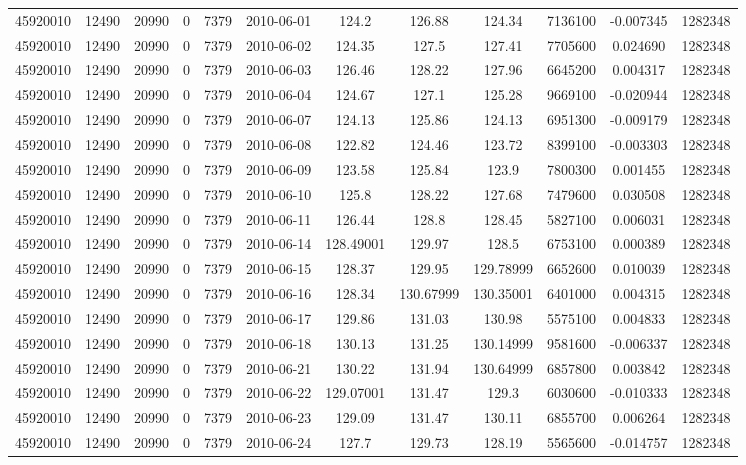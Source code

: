 \documentclass[12 pt]{article}
\begin{document}
\begin{flushleft}
\begin{table}[h]
\begin{tabular}{c c c c c c c c c c c c }
45920010 & 12490 & 20990 & 0 & 7379 & 2010-06-01 & 124.2 & 126.88 & 124.34 & 7136100 & -0.007345 & 1282348\\
45920010 & 12490 & 20990 & 0 & 7379 & 2010-06-02 & 124.35 & 127.5 & 127.41 & 7705600 & 0.024690 & 1282348\\
45920010 & 12490 & 20990 & 0 & 7379 & 2010-06-03 & 126.46 & 128.22 & 127.96 & 6645200 & 0.004317 & 1282348\\
45920010 & 12490 & 20990 & 0 & 7379 & 2010-06-04 & 124.67 & 127.1 & 125.28 & 9669100 & -0.020944 & 1282348\\
45920010 & 12490 & 20990 & 0 & 7379 & 2010-06-07 & 124.13 & 125.86 & 124.13 & 6951300 & -0.009179 & 1282348\\
45920010 & 12490 & 20990 & 0 & 7379 & 2010-06-08 & 122.82 & 124.46 & 123.72 & 8399100 & -0.003303 & 1282348\\
45920010 & 12490 & 20990 & 0 & 7379 & 2010-06-09 & 123.58 & 125.84 & 123.9 & 7800300 & 0.001455 & 1282348\\
45920010 & 12490 & 20990 & 0 & 7379 & 2010-06-10 & 125.8 & 128.22 & 127.68 & 7479600 & 0.030508 & 1282348\\
45920010 & 12490 & 20990 & 0 & 7379 & 2010-06-11 & 126.44 & 128.8 & 128.45 & 5827100 & 0.006031 & 1282348\\
45920010 & 12490 & 20990 & 0 & 7379 & 2010-06-14 & 128.49001 & 129.97 & 128.5 & 6753100 & 0.000389 & 1282348\\
45920010 & 12490 & 20990 & 0 & 7379 & 2010-06-15 & 128.37 & 129.95 & 129.78999 & 6652600 & 0.010039 & 1282348\\
45920010 & 12490 & 20990 & 0 & 7379 & 2010-06-16 & 128.34 & 130.67999 & 130.35001 & 6401000 & 0.004315 & 1282348\\
45920010 & 12490 & 20990 & 0 & 7379 & 2010-06-17 & 129.86 & 131.03 & 130.98 & 5575100 & 0.004833 & 1282348\\
45920010 & 12490 & 20990 & 0 & 7379 & 2010-06-18 & 130.13 & 131.25 & 130.14999 & 9581600 & -0.006337 & 1282348\\
45920010 & 12490 & 20990 & 0 & 7379 & 2010-06-21 & 130.22 & 131.94 & 130.64999 & 6857800 & 0.003842 & 1282348\\
45920010 & 12490 & 20990 & 0 & 7379 & 2010-06-22 & 129.07001 & 131.47 & 129.3 & 6030600 & -0.010333 & 1282348\\
45920010 & 12490 & 20990 & 0 & 7379 & 2010-06-23 & 129.09 & 131.47 & 130.11 & 6855700 & 0.006264 & 1282348\\
45920010 & 12490 & 20990 & 0 & 7379 & 2010-06-24 & 127.7 & 129.73 & 128.19 & 5565600 & -0.014757 & 1282348\\

\end{tabular}
\end{table}
\end{flushleft}
\end{document}
